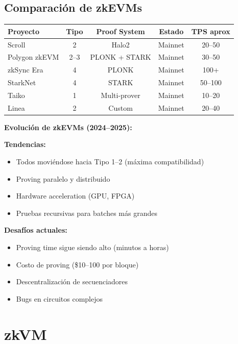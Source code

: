 \documentclass[11pt,a4paper,twoside]{book}
\begin{document}
\subsection{Comparaci\'on de zkEVMs}

\begin{center}
\begin{tabular}{lcccc}
\toprule
\textbf{Proyecto} & \textbf{Tipo} & \textbf{Proof System} & \textbf{Estado} & \textbf{TPS aprox} \\
\midrule
Scroll & 2 & Halo2 & Mainnet & 20--50 \\
Polygon zkEVM & 2--3 & PLONK + STARK & Mainnet & 30--50 \\
zkSync Era & 4 & PLONK & Mainnet & 100+ \\
StarkNet & 4 & STARK & Mainnet & 50--100 \\
Taiko & 1 & Multi-prover & Mainnet & 10--20 \\
Linea & 2 & Custom & Mainnet & 20--40 \\
\bottomrule
\end{tabular}
\end{center}

\begin{remark}
\textbf{Evoluci\'on de zkEVMs (2024--2025):}

\textbf{Tendencias:}
\begin{itemize}
    \item Todos movi\'endose hacia Tipo 1--2 (m\'axima compatibilidad)
    \item Proving paralelo y distribuido
    \item Hardware acceleration (GPU, FPGA)
    \item Pruebas recursivas para batches m\'as grandes
\end{itemize}

\textbf{Desaf\'ios actuales:}
\begin{itemize}
    \item Proving time sigue siendo alto (minutos a horas)
    \item Costo de proving (\$10--100 por bloque)
    \item Descentralizaci\'on de secuenciadores
    \item Bugs en circuitos complejos
\end{itemize}
\end{remark}

\section{zkVM}
\end{document}
